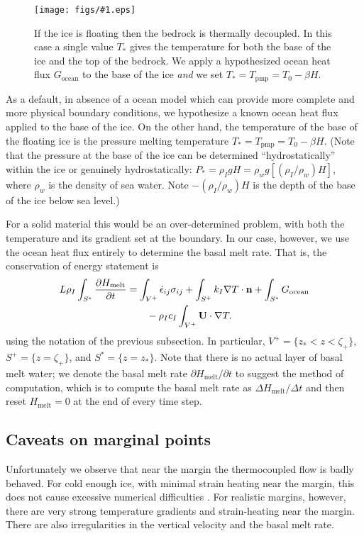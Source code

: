 \documentclass[12pt,final]{amsart}%
\theoremstyle{plain}
\theoremstyle{definition}
\theoremstyle{remark}
\newcommand{\regfigure}[2]{\texttt{[image: figs/\#1.eps]}}
\newcommand{\ddt}[1]{\ensuremath{\frac{\partial #1}{\partial t}}}
\def\eps{\epsilon}
\newcommand{\grad}{\nabla}
\newcommand{\nhat}{\mathbf{n}}
\newcommand{\Tpmp}{T_{\text{pmp}}}
\newcommand{\bU}{{\mathbf{U}}}
\begin{document}
\begin{figure}[ht]
\regfigure{floatingcase}{3}
\caption{If the ice is floating then the bedrock is thermally decoupled.  In this case a single value $T_\ast$ gives the temperature for both the base of the ice and the top of the bedrock.  We apply a hypothesized ocean heat flux $G_{\text{ocean}}$ to the base of the ice \emph{and} we set $T_\ast = \Tpmp = T_0 - \beta H$.}
\label{fig:floatingcase}
\end{figure}

As a default, in absence of a ocean model which can provide more complete and more physical boundary conditions, we hypothesize a known ocean heat flux applied to the base of the ice.  On the other hand, the temperature of the base of the floating ice is the pressure melting temperature $T_\ast = \Tpmp = T_0 - \beta H$.  (Note that the pressure at the base of the ice can be determined ``hydrostatically'' within the ice or genuinely hydrostatically: $P_\ast = \rho_I g H = \rho_w g \left[(\rho_I/\rho_w) H\right]$, where $\rho_w$ is the density of sea water.  Note $-(\rho_I/\rho_w) H$ is the depth of the base of the ice below sea level.)

For a solid material this would be an over-determined problem, with both the temperature and its gradient set at the boundary.  In our case, however, we use the ocean heat flux entirely to determine the basal melt rate.  That is, the conservation of energy statement is
\begin{align}
L \rho_I \int_{S^\ast} \ddt{H_{\text{melt}}} &= \int_{V^+} \dot \eps_{ij} \sigma_{ij} + \int_{S^+} k_I \grad T \cdot \nhat + \int_{S^\ast} G_{\text{ocean}} \label{basefloating}\\
    &\qquad - \rho_I c_I\int_{V^+} \bU\cdot \grad T.\notag
\end{align}
using the notation of the previous subsection.  In particular, $V^+ = \{z_\ast < z < \zeta_+\}$, $S^+ = \{z=\zeta_+\}$, and $S^\ast = \{z=z_\ast\}$.  Note that there is no actual layer of basal melt water; we denote the basal melt rate $\partial H_{\text{melt}}/\partial t$ to suggest the method of computation, which is to compute the basal melt rate as $\Delta H_{\text{melt}}/\Delta t$ and then reset $H_{\text{melt}}=0$ at the end of every time step.

\subsection*{Caveats on marginal points}  Unfortunately we observe that near the margin the thermocoupled flow is badly behaved.  For cold enough ice, with minimal strain heating near the margin, this does not cause excessive numerical difficulties \citep{BBL}.  For realistic margins, however, there are very strong temperature gradients and strain-heating near the margin.  There are also irregularities in the vertical velocity and the basal melt rate.
\end{document}
